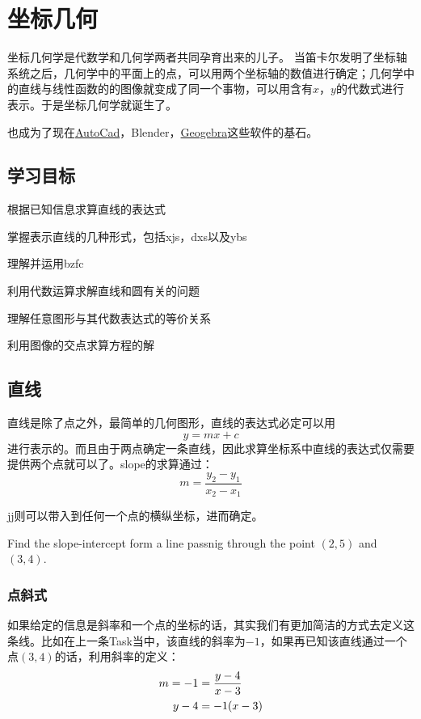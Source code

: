 \chapter{坐标几何}
\label{ch:Coordinate Geometry}
坐标几何学是代数学和几何学两者共同孕育出来的儿子。
当笛卡尔发明了坐标轴系统之后，几何学中的平面上的点，可以用两个坐标轴的数值进行确定；几何学中的直线与线性函数的的图像就变成了同一个事物，可以用含有$x$，$y$的代数式进行表示。于是坐标几何学就诞生了。

也成为了现在\href{https://www.autodesk.com}{AutoCad}，Blender，\href{https://www.geogebra.org}{Geogebra}这些软件的基石。

\section*{学习目标}
\begin{todolist}
 \item 根据已知信息求算直线的表达式
 \item 掌握表示直线的几种形式，包括\gls{xjs}，\gls{dxs}以及\gls{ybs}
 \item 理解并运用\gls{bzfc}
 \item 利用代数运算求解直线和圆有关的问题
 \item 理解任意图形与其代数表达式的等价关系
 \item 利用图像的交点求算方程的解
\end{todolist}
\clearpage

\section{直线}
\label{sec:Straight Line}
直线是除了点之外，最简单的几何图形，直线的表达式必定可以用
\[
	y=mx+c
\]
进行表示的。而且由于两点确定一条直线，因此求算坐标系中直线的表达式仅需要提供两个点就可以了。\gls{slope}的求算通过：
\[
	m=\frac{y_2-y_1}{x_2-x_1}
\]

\gls{jj}则可以带入到任何一个点的横纵坐标，进而确定。

\begin{TaskBox}
Find the slope-intercept form a line passnig through the point $(2,5)$ and $(3,4)$.
\end{TaskBox}

\subsection*{点斜式}
\label{subsec:Point Slope Form}
如果给定的信息是斜率和一个点的坐标的话，其实我们有更加简洁的方式去定义这条线。比如在上一条Task当中，该直线的斜率为$-1$，如果再已知该直线通过一个点$(3,4)$的话，利用斜率的定义：
\begin{align}
 \notag m=-1 &=\frac{y-4}{x-3}\\ %
  y-4 &=-1(x-3)
\end{align}

